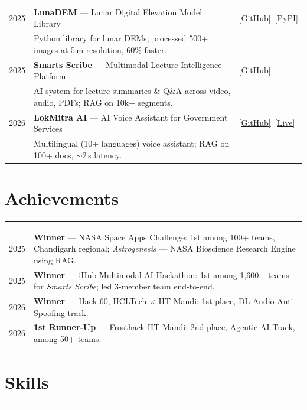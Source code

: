 \documentclass[a4paper,10pt]{article}
\begin{document}
\begin{tabular}{L M G}
2025 & \textbf{LunaDEM} --- Lunar Digital Elevation Model Library & \href{https://github.com/Kartavya728/LunaDEM}{\textcolor{linkblue}{[GitHub]}}~\href{https://pypi.org/project/lunadem/0.1.1/}{\textcolor{linkblue}{[PyPI]}} \\
& Python library for lunar DEMs; processed 500+ images at 5\,m resolution, 60\% faster. & \\
2025 & \textbf{Smarts Scribe} --- Multimodal Lecture Intelligence Platform & \href{https://github.com/Kartavya728/Smart-Scribes}{\textcolor{linkblue}{[GitHub]}} \\
& AI system for lecture summaries \& Q\&A across video, audio, PDFs; RAG on 10k+ segments. & \\
2026 & \textbf{LokMitra AI} --- AI Voice Assistant for Government Services & \href{https://github.com/Kartavya728/LokMitra-AI}{\textcolor{linkblue}{[GitHub]}}~\href{https://modest-reflection-production-893c.up.railway.app/}{\textcolor{linkblue}{[Live]}} \\
& Multilingual (10+ languages) voice assistant; RAG on 100+ docs, $\sim$2\,s latency. &
\end{tabular}

\section*{Achievements}
\noindent\rule{\linewidth}{0.6pt}

\begin{tabular}{L W}
2025 & \textbf{Winner} --- NASA Space Apps Challenge: 1st among 100+ teams, Chandigarh regional; \textit{Astrogenesis} --- NASA Bioscience Research Engine using RAG. \\
2025 & \textbf{Winner} --- iHub Multimodal AI Hackathon: 1st among 1,600+ teams for \textit{Smarts Scribe}; led 3-member team end-to-end. \\
2026 & \textbf{Winner} --- Hack 60, HCLTech $\times$ IIT Mandi: 1st place, DL Audio Anti-Spoofing track. \\
2026 & \textbf{1st Runner-Up} --- Frosthack IIT Mandi: 2nd place, Agentic AI Track, among 50+ teams.
\end{tabular}

\section*{Skills}
\noindent\rule{\linewidth}{0.6pt}
\end{document}
